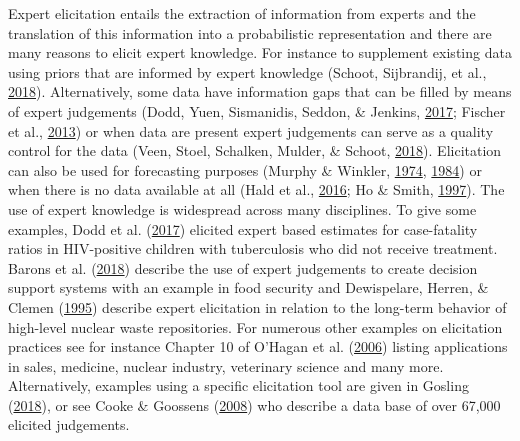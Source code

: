 \documentclass[openright,titlepage,12pt,a4paper]{book}
\begin{document}
Expert elicitation entails the extraction of information from experts and the translation of this information into a probabilistic representation and there are many reasons to elicit expert knowledge. For instance to supplement existing data using priors that are informed by expert knowledge (Schoot, Sijbrandij, et al., \protect\hyperlink{ref-van_de_schoot_bayesian_2018}{2018}). Alternatively, some data have information gaps that can be filled by means of expert judgements (Dodd, Yuen, Sismanidis, Seddon, \& Jenkins, \protect\hyperlink{ref-dodd_global_2017}{2017}; Fischer et al., \protect\hyperlink{ref-fischer_estimating_2013}{2013}) or when data are present expert judgements can serve as a quality control for the data (Veen, Stoel, Schalken, Mulder, \& Schoot, \protect\hyperlink{ref-veen_using_2018}{2018}). Elicitation can also be used for forecasting purposes (Murphy \& Winkler, \protect\hyperlink{ref-murphy_subjective_1974}{1974}, \protect\hyperlink{ref-murphy_probability_1984}{1984}) or when there is no data available at all (Hald et al., \protect\hyperlink{ref-hald_world_2016}{2016}; Ho \& Smith, \protect\hyperlink{ref-ho_volcanic_1997}{1997}). The use of expert knowledge is widespread across many disciplines. To give some examples, Dodd et al. (\protect\hyperlink{ref-dodd_global_2017}{2017}) elicited expert based estimates for case-fatality ratios in HIV-positive children with tuberculosis who did not receive treatment. Barons et al. (\protect\hyperlink{ref-barons_eliciting_2018}{2018}) describe the use of expert judgements to create decision support systems with an example in food security and Dewispelare, Herren, \& Clemen (\protect\hyperlink{ref-dewispelare_use_1995}{1995}) describe expert elicitation in relation to the long-term behavior of high-level nuclear waste repositories. For numerous other examples on elicitation practices see for instance Chapter 10 of O'Hagan et al. (\protect\hyperlink{ref-ohagan_uncertain_2006}{2006}) listing applications in sales, medicine, nuclear industry, veterinary science and many more. Alternatively, examples using a specific elicitation tool are given in Gosling (\protect\hyperlink{ref-gosling_shelf:_2018}{2018}), or see Cooke \& Goossens (\protect\hyperlink{ref-cooke_tu_2008}{2008}) who describe a data base of over 67,000 elicited judgements.
\end{document}
